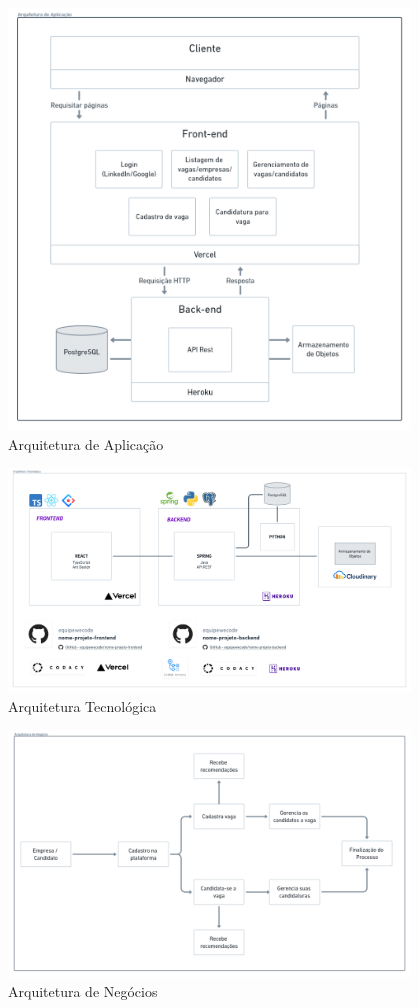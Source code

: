 \begin{figure}[H]
	\centering
	\caption{\label{fig_arq_app}Arquitetura de Aplicação}
	\includegraphics[width=0.95\textwidth]{imagens/arq-proj-arq-app.png}
\end{figure}

\begin{figure}[H]
	\centering
	\caption{\label{fig_arq_tec}Arquitetura Tecnológica}
	\includegraphics[width=0.95\textwidth]{imagens/arq-proj-arq-tec.png}
\end{figure}

\begin{figure}[H]
	\centering
	\caption{\label{fig_arq_negocio}Arquitetura de Negócios}
	\includegraphics[width=0.95\textwidth]{imagens/arq-proj-arq-negocio.png}
\end{figure}